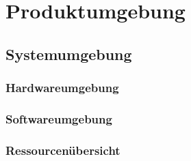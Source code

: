 \documentclass[11pt, a4paper]{article}
\begin{document}
			
			

			
	\section{Produktumgebung}
	
	
		\subsection{Systemumgebung}
		
		
			\subsubsection{Hardwareumgebung}
			
			
			\subsubsection{Softwareumgebung}
			

			\subsubsection{Ressourcenübersicht}
			
					
\end{document}
